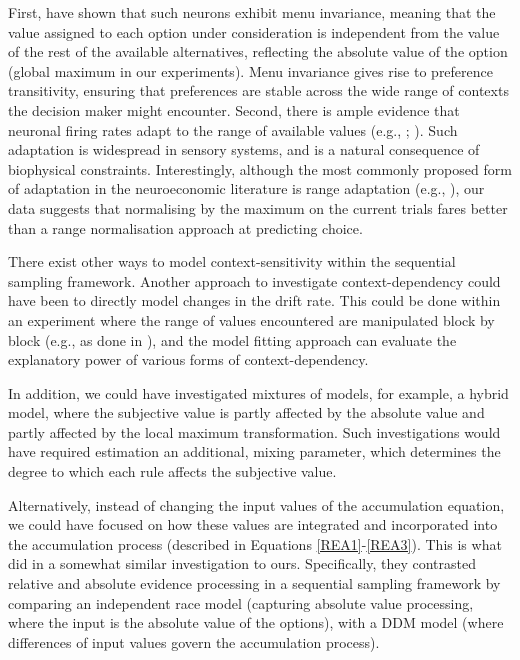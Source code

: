 \documentclass[11pt,a4paper]{article}
\begin{document}
First,  have shown that such neurons exhibit menu invariance, meaning that the value assigned to each option under consideration is independent from the value of the rest of the available alternatives, reflecting the absolute value of the option (global maximum in our experiments). Menu invariance gives rise to preference transitivity, ensuring that preferences are stable across the wide range of contexts the decision maker might encounter. Second, there is ample evidence that neuronal firing rates adapt to the range of available values (e.g., ; ). Such adaptation is widespread in sensory systems, and is a natural consequence of biophysical constraints. Interestingly, although the most commonly proposed form of adaptation in the neuroeconomic literature is range adaptation (e.g., ), our data suggests that normalising by the maximum on the current trials fares better than a range normalisation approach at predicting choice.


There exist other ways to model context-sensitivity within the sequential sampling framework. Another approach to investigate context-dependency could have been to directly model changes in the drift rate. This could be done within an experiment where the range of values encountered are manipulated block by block (e.g., as done in ), and the model fitting approach can evaluate the explanatory power of various forms of context-dependency.

In addition, we could have investigated mixtures of models, for example, a hybrid model, where the subjective value is partly affected by the absolute value and partly affected by the local maximum transformation. Such investigations would have required estimation an additional, mixing parameter, which determines the degree to which each rule affects the subjective value.


 Alternatively, instead of changing the input values of the accumulation equation, we could have focused on how these values are integrated and incorporated into the accumulation process (described in Equations \ref{REA1}-\ref{REA3}). This is what  did in a somewhat similar investigation to ours. Specifically, they contrasted relative and absolute evidence processing in a sequential sampling framework by comparing an independent race model (capturing absolute value processing, where the input is the absolute value of the options), with a DDM model (where differences of input values govern the accumulation process).
\end{document}

